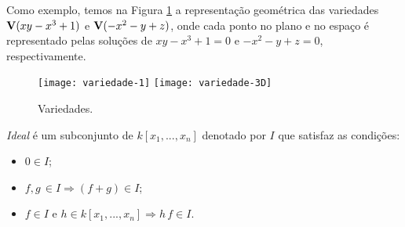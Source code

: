 Como exemplo, temos na Figura \ref{fig.variedades} a representação geométrica das variedades ${\bf V}(xy-x^3+1)$ e ${\bf V}(-x^2-y+z)$, onde cada ponto no plano e no espaço é representado pelas soluções de $xy-x^3+1=0$ e $-x^2-y+z=0$, respectivamente.
\begin{figure}
\caption{Variedades.}
\texttt{[image: variedade-1]}\hfill
\texttt{[image: variedade-3D]}\hfill
{}
\label{fig.variedades}
\end{figure} 

{\it Ideal} é um subconjunto de $k[x_1,...,x_n]$ denotado por $I$ que satisfaz as condições:
\begin{itemize}
\item $0\in I$;
\item $f,g\,\in I \Rightarrow (f+g)\in I$;
\item $f \in I$ e $h \in k[x_1,...,x_n] \Rightarrow h\,f \in I$. 
\end{itemize}

